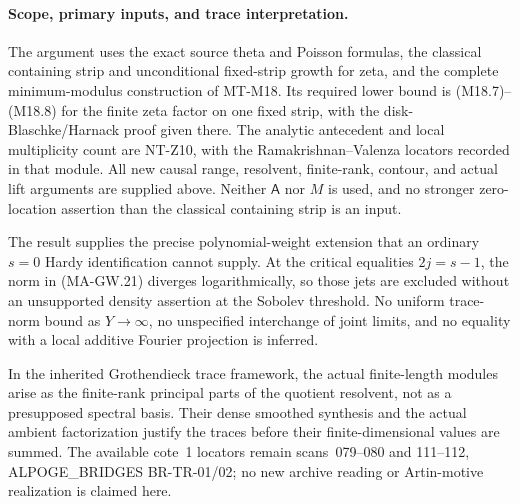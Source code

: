 \paragraph{Scope, primary inputs, and trace interpretation.}
The argument uses the exact source theta and Poisson formulas,
the classical containing strip and unconditional fixed-strip
growth for zeta, and the complete minimum-modulus construction
of MT-M18.  Its required lower bound is (M18.7)--(M18.8)
for the finite zeta factor on one fixed strip, with the
disk-Blaschke/Harnack proof given there.
The analytic antecedent and local multiplicity count are
NT-Z10, with the Ramakrishnan--Valenza locators recorded
in that module.  All new causal range, resolvent, finite-rank,
contour, and actual lift arguments are supplied above.
Neither $\mathsf A$ nor $M$ is used, and no stronger
zero-location assertion than the classical containing
strip is an input.

The result supplies the precise polynomial-weight extension
that an ordinary $s=0$ Hardy identification cannot supply.
At the critical equalities $2j=s-1$, the norm in
(MA-GW.21) diverges logarithmically, so those jets are
excluded without an unsupported density assertion at the
Sobolev threshold.
No uniform trace-norm bound as $Y\to\infty$, no unspecified
interchange of joint limits, and no equality with a local
additive Fourier projection is inferred.

In the inherited Grothendieck trace framework, the actual
finite-length modules arise as the finite-rank principal
parts of the quotient resolvent, not as a presupposed
spectral basis.  Their dense smoothed synthesis and the
actual ambient factorization justify the traces before
their finite-dimensional values are summed.
The available cote~1 locators remain scans~079--080 and
111--112, ALPOGE\_BRIDGES BR-TR-01/02; no new archive
reading or Artin-motive realization is claimed here.
